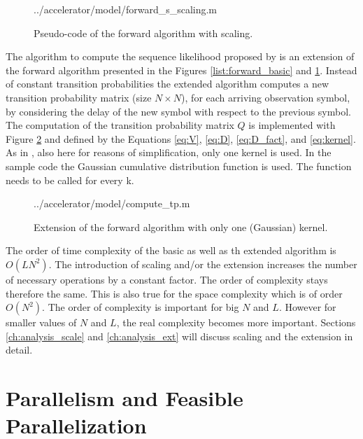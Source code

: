 \documentclass[mscthesis]{usiinfthesis}
\begin{document}
\begin{figure}
    \centering
    
        {../accelerator/model/forward_s_scaling.m}
    \caption{Pseudo-code of the forward algorithm with scaling.}
    \label{list:forward_scaling}
\end{figure}

The algorithm to compute the sequence likelihood proposed by \cite{salfner08}
is an extension of the forward algorithm presented in the Figures
\ref{list:forward_basic} and \ref{list:forward_scaling}. Instead of constant
transition probabilities the extended algorithm computes a new transition
probability matrix (size $N \times N$), for each arriving observation symbol,
by considering the delay of the new symbol with respect to the previous symbol.
The computation of the transition probability matrix $Q$ is implemented with
Figure \ref{list:ext} and defined by the Equations \ref{eq:V}, \ref{eq:D},
\ref{eq:D_fact}, and \ref{eq:kernel}. As in \cite{salfner08}, also here for
reasons of simplification, only one kernel is used. In the sample code the
Gaussian cumulative distribution function is used. The function needs to be
called for every k.

\begin{figure}
    \centering
    
        {../accelerator/model/compute_tp.m}
        \caption{Extension of the forward algorithm with only one (Gaussian)
            kernel.}
    \label{list:ext}
\end{figure}

The order of time complexity of the basic as well as th extended algorithm is
$O(LN^2)$. The introduction of scaling and/or the extension increases the
number of necessary operations by a constant factor. The order of complexity
stays therefore the same. This is also true for the space complexity which is of
order $O(N^2)$. The order of complexity is important for big $N$ and $L$.
However for smaller values of $N$ and $L$, the real complexity becomes more
important. Sections \ref{ch:analysis_scale} and \ref{ch:analysis_ext} will
discuss scaling and the extension in detail.

\section{Parallelism and Feasible Parallelization}
\label{ch:analysis_parallel}
\end{document}
